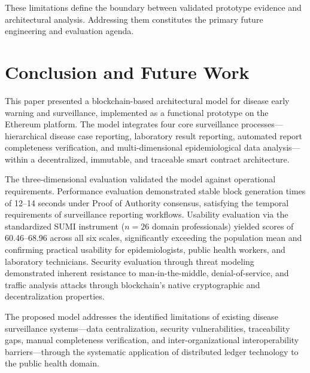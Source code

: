 \documentclass[AMA,LATO1COL]{WileyNJD-v2}
\begin{document}
These limitations define the boundary between validated prototype evidence and architectural analysis. Addressing them constitutes the primary future engineering and evaluation agenda.

\section{Conclusion and Future Work}\label{sec:conclusion}

This paper presented a blockchain-based architectural model for disease early warning and surveillance, implemented as a functional prototype on the Ethereum platform. The model integrates four core surveillance processes---hierarchical disease case reporting, laboratory result reporting, automated report completeness verification, and multi-dimensional epidemiological data analysis---within a decentralized, immutable, and traceable smart contract architecture.

The three-dimensional evaluation validated the model against operational requirements. Performance evaluation demonstrated stable block generation times of 12--14 seconds under Proof of Authority consensus, satisfying the temporal requirements of surveillance reporting workflows. Usability evaluation via the standardized SUMI instrument ($n=26$ domain professionals) yielded scores of 60.46--68.96 across all six scales, significantly exceeding the population mean and confirming practical usability for epidemiologists, public health workers, and laboratory technicians. Security evaluation through threat modeling demonstrated inherent resistance to man-in-the-middle, denial-of-service, and traffic analysis attacks through blockchain's native cryptographic and decentralization properties.

The proposed model addresses the identified limitations of existing disease surveillance systems---data centralization, security vulnerabilities, traceability gaps, manual completeness verification, and inter-organizational interoperability barriers---through the systematic application of distributed ledger technology to the public health domain.
\end{document}
